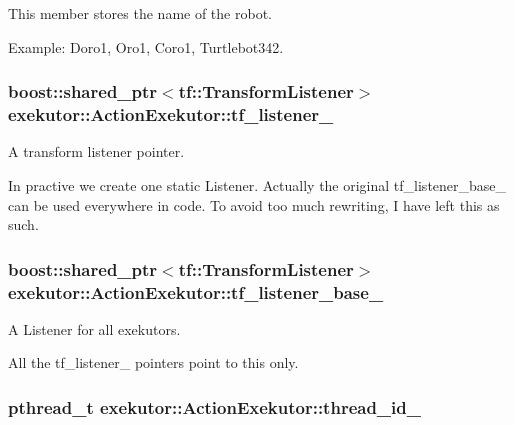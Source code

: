 \-This member stores the name of the robot. 

\-Example\-: \-Doro1, \-Oro1, \-Coro1, \-Turtlebot342. \hypertarget{classexekutor_1_1ActionExekutor_ae518bc34ee6123c118ba940fd1959f65}{
\subsubsection[{tf\-\_\-listener\-\_\-}]{\setlength{\rightskip}{0pt plus 5cm}boost\-::shared\-\_\-ptr$<$tf\-::\-Transform\-Listener$>$ {\bf exekutor\-::\-Action\-Exekutor\-::tf\-\_\-listener\-\_\-}}}\label{classexekutor_1_1ActionExekutor_ae518bc34ee6123c118ba940fd1959f65}


\-A transform listener pointer. 

\-In practive we create one static \-Listener. \-Actually the original tf\-\_\-listener\-\_\-base\-\_\- can be used everywhere in code. \-To avoid too much rewriting, \-I have left this as such. \hypertarget{classexekutor_1_1ActionExekutor_aae544e9d0fdc59eb5c85b05d4af8afb8}{
\subsubsection[{tf\-\_\-listener\-\_\-base\-\_\-}]{\setlength{\rightskip}{0pt plus 5cm}boost\-::shared\-\_\-ptr$<$tf\-::\-Transform\-Listener$>$ {\bf exekutor\-::\-Action\-Exekutor\-::tf\-\_\-listener\-\_\-base\-\_\-}}}\label{classexekutor_1_1ActionExekutor_aae544e9d0fdc59eb5c85b05d4af8afb8}


\-A \-Listener for all exekutors. 

\-All the tf\-\_\-listener\-\_\- pointers point to this only. \hypertarget{classexekutor_1_1ActionExekutor_a8d7e748c6d705da31eea62af6723ebca}{
\subsubsection[{thread\-\_\-id\-\_\-}]{\setlength{\rightskip}{0pt plus 5cm}pthread\-\_\-t {\bf exekutor\-::\-Action\-Exekutor\-::thread\-\_\-id\-\_\-}}}\label{classexekutor_1_1ActionExekutor_a8d7e748c6d705da31eea62af6723ebca}


